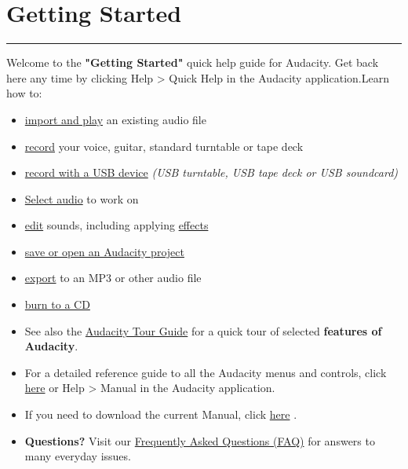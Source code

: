 \label{quick_help_}
\ensurespace\section{Getting Started}
\par\vspace{1mm}\hrule
\begin{multicols}{2}\par Welcome to the \textbf{"Getting Started"} quick help guide for Audacity. Get back here any time by clicking Help > Quick Help in the Audacity application.Learn how to:

\begin{itemize}
\item 
\hyperref[\foo{man_play_}]{ import and play}
 an existing audio file 
\item 
\hyperref[\foo{man_record_}]{ record}
 your voice, guitar, standard turntable or tape deck
\item 
\hyperref[\foo{man_usb_recording_}]{ record with a USB device}
\textit{(USB turntable, USB tape deck or USB soundcard)}
\item 
\hyperref[\foo{man_selecting_audio_the_basics_}]{Select audio}
 to work on
\item 
\hyperref[\foo{man_edit_}]{ edit}
 sounds, including applying 
\hyperref[\foo{man_effect_menu_}]{effects}

\item 
\hyperref[\foo{man_saving_}]{ save or open an Audacity project}

\item 
\hyperref[\foo{man_export_}]{ export}
 to an MP3 or other audio file
\item 
\hyperref[\foo{man_burncd_}]{ burn to a CD}

\end{itemize}

\begin{itemize}
\item  See also the 
\hyperref[\foo{man_audacity_tour_guide_}]{Audacity Tour Guide}
 for a quick tour of selected \textbf{features of Audacity}. 
\item  For a detailed reference guide to all the Audacity menus and controls, click 
\hyperref[\foo{index_reference}]{here}
 or Help > Manual in the Audacity application. 
\item  If you need to download the current Manual, click 
\hyperref[\foo{man_unzipping_the_manual_}]{here}
.
\item \textbf{Questions?} Visit our 
\hyperref[\foo{man_faq_}]{Frequently Asked Questions (FAQ)}
 for answers to many everyday issues.  
\end{itemize}
\end{multicols}